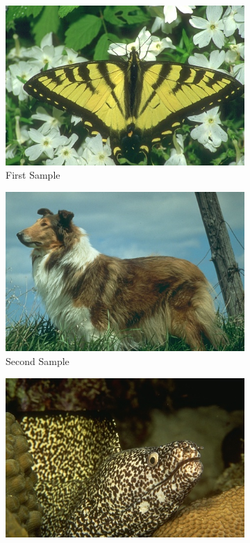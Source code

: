 \documentclass[12pt]{article}
\begin{document}
  \begin{figure}[h!]
	\centering
	\begin{subfigure}[b]{0.24\textwidth}
		\includegraphics[width=\textwidth]{./1.jpg}
		\caption{First Sample}
		\label{fig:lenna37full}
	\end{subfigure}
	\hfill
	\begin{subfigure}[b]{0.24\textwidth}
		\includegraphics[width=\textwidth]{./2.jpg}
		\caption{Second Sample}
	\end{subfigure}
	\hfill
	\begin{subfigure}[b]{0.24\textwidth}
		\includegraphics[width=\textwidth]{./3.jpg}

\end{subfigure}
\end{figure}
\end{document}
